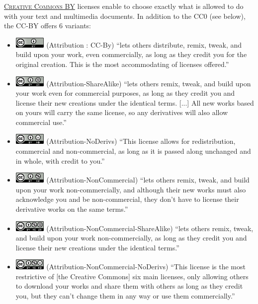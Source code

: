 \noindent {} \textsc{\href{https://creativecommons.org/}{Creative Commons BY}} licenses enable to choose exactly what is allowed to do with your text and multimedia documents. In addition to the CC0 (see below), the CC-BY offers 6 variants\cite{creativecommons.org_creative_2015}:
\begin{itemize}
\item\includegraphics[width=15mm]{./images/CC-By_88x31.png} (Attribution : CC-By) ``lets others distribute, remix, tweak, and build upon your work, even commercially, as long as they credit you for the original creation. This is the most accommodating of licenses offered.''
\item\includegraphics[width=15mm]{./images/CC-By-SA_88x31.png} (Attribution-ShareAlike) ``lets others remix, tweak, and build upon your work even for commercial purposes, as long as they credit you and license their new creations under the identical terms. [...] All new works based on yours will carry the same license, so any derivatives will also allow commercial use.''
\item\includegraphics[width=15mm]{./images/CC-By-ND_88x31.png} (Attribution-NoDerivs) ``This license allows for redistribution, commercial and non-commercial, as long as it is passed along unchanged and in whole, with credit to you.''
\item\includegraphics[width=15mm]{./images/CC-By-NC_88x31.png} (Attribution-NonCommercial) ``lets others remix, tweak, and build upon your work non-commercially, and although their new works must also acknowledge you and be non-commercial, they don’t have to license their derivative works on the same terms.''
\item\includegraphics[width=15mm]{./images/CC-By-NC-SA_88x31.png} (Attribution-NonCommercial-ShareAlike) ``lets others remix, tweak, and build upon your work non-commercially, as long as they credit you and license their new creations under the identical terms.''
\item\includegraphics[width=15mm]{./images/CC-By-NC-ND_88x31.png} (Attribution-NonCommercial-NoDerivs) ``This license is the most restrictive of [the Creative Commons] six main licenses, only allowing others to download your works and share them with others as long as they credit you, but they can’t change them in any way or use them commercially.''
\end{itemize}


